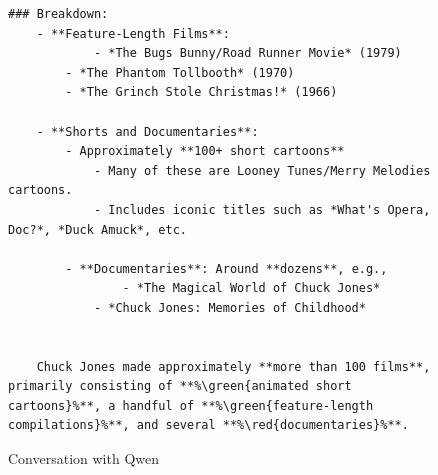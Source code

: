 \documentclass[fleqn,moreauthors,10pt]{ds_report}
\newcommand{\red}[1]{\textcolor{red}{#1}}
\newcommand{\green}[1]{\textcolor{green}{#1}}
\begin{document}
\begin{appendix}
\begin{figure}
\begin{tcolorbox}
\begin{lstlisting}[escapechar=\%]
	### Breakdown:
	- **Feature-Length Films**: 
    		- *The Bugs Bunny/Road Runner Movie* (1979)
	    - *The Phantom Tollbooth* (1970)
	    - *The Grinch Stole Christmas!* (1966)

	- **Shorts and Documentaries**:
	    - Approximately **100+ short cartoons**
	        - Many of these are Looney Tunes/Merry Melodies cartoons.
	        - Includes iconic titles such as *What's Opera, Doc?*, *Duck Amuck*, etc.

	    - **Documentaries**: Around **dozens**, e.g.,
	    	    - *The Magical World of Chuck Jones*
	        - *Chuck Jones: Memories of Childhood*


	Chuck Jones made approximately **more than 100 films**, primarily consisting of **%\green{animated short cartoons}%**, a handful of **%\green{feature-length compilations}%**, and several **%\red{documentaries}%**.
\end{lstlisting}
\end{tcolorbox}
\caption{Conversation with Qwen}
\label{qwenconvo}
\end{figure}


 


\end{appendix}
\end{document}
